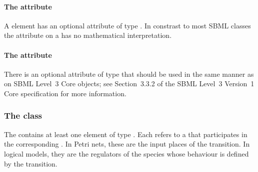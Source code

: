 \paragraph{The  attribute}
A \Transition element has an optional  attribute of type .  In constrast to most SBML classes the  attribute on a \Transition has no mathematical interpretation.

\paragraph{The  attribute}
There is an optional  attribute of type  that should be used
in the same manner as on SBML Level~3 Core
objects; see Section~3.3.2 of the SBML Level~3 Version~1 Core
specification for more information.

%
%

\subsubsection{The  class}
\label{input-class}
The \ListOfInputs contains at least one element of type \Input. 
Each \Input refers to a \QualitativeSpecies that participates in the corresponding \Transition.
In Petri nets, these are the input places of the transition. In logical models, they are the regulators of the species whose behaviour is defined by the transition.

